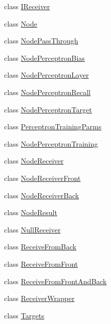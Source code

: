 \begin{DoxyCompactItemize}
\item 
class \hyperlink{class_neural_1_1_i_receiver}{IReceiver}
\item 
class \hyperlink{class_neural_1_1_node}{Node}
\item 
class \hyperlink{class_neural_1_1_node_pass_through}{NodePassThrough}
\item 
class \hyperlink{class_neural_1_1_node_perceptron_bias}{NodePerceptronBias}
\item 
class \hyperlink{class_neural_1_1_node_perceptron_layer}{NodePerceptronLayer}
\item 
class \hyperlink{class_neural_1_1_node_perceptron_recall}{NodePerceptronRecall}
\item 
class \hyperlink{class_neural_1_1_node_perceptron_target}{NodePerceptronTarget}
\item 
class \hyperlink{class_neural_1_1_perceptron_training_parms}{PerceptronTrainingParms}
\item 
class \hyperlink{class_neural_1_1_node_perceptron_training}{NodePerceptronTraining}
\item 
class \hyperlink{class_neural_1_1_node_receiver}{NodeReceiver}
\item 
class \hyperlink{class_neural_1_1_node_receiver_front}{NodeReceiverFront}
\item 
class \hyperlink{class_neural_1_1_node_receiver_back}{NodeReceiverBack}
\item 
class \hyperlink{class_neural_1_1_node_result}{NodeResult}
\item 
class \hyperlink{class_neural_1_1_null_receiver}{NullReceiver}
\item 
class \hyperlink{class_neural_1_1_receive_from_back}{ReceiveFromBack}
\item 
class \hyperlink{class_neural_1_1_receive_from_front}{ReceiveFromFront}
\item 
class \hyperlink{class_neural_1_1_receive_from_front_and_back}{ReceiveFromFrontAndBack}
\item 
class \hyperlink{class_neural_1_1_receiver_wrapper}{ReceiverWrapper}
\item 
class \hyperlink{class_neural_1_1_targets}{Targets}
\end{DoxyCompactItemize}
